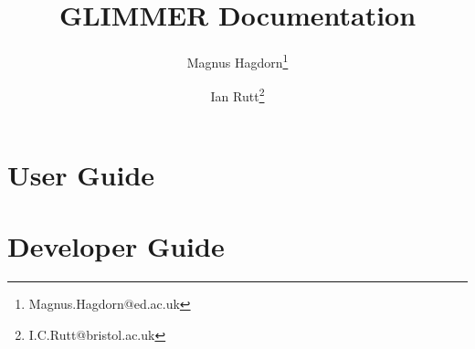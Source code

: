 

\frontmatter
\title{GLIMMER Documentation}
\author{Magnus Hagdorn\thanks{Magnus.Hagdorn@ed.ac.uk} \and Ian Rutt\thanks{I.C.Rutt@bristol.ac.uk}}
\maketitle
\tableofcontents

\mainmatter
\chapter{User Guide}
\newcommand{\dir}{ug}


\chapter{Developer Guide}
\renewcommand{\dir}{dg}

